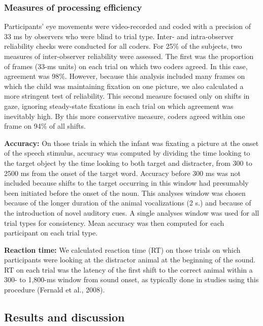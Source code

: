 \documentclass[english,floatsintext,man]{apa6}
\theoremstyle{definition}
\theoremstyle{definition}
\theoremstyle{definition}
\theoremstyle{remark}
\begin{document}
\hypertarget{measures-of-processing-efficiency}{%
\subsubsection{Measures of processing
efficiency}\label{measures-of-processing-efficiency}}

Participants' eye movements were video-recorded and coded with a
precision of 33 ms by observers who were blind to trial type. Inter- and
intra-observer reliability checks were conducted for all coders. For
25\% of the subjects, two measures of inter-observer reliability were
assessed. The first was the proportion of frames (33-ms units) on each
trial on which two coders agreed. In this case, agreement was 98\%.
However, because this analysis included many frames on which the child
was maintaining fixation on one picture, we also calculated a more
stringent test of reliability. This second measure focused only on
shifts in gaze, ignoring steady-state fixations in each trial on which
agreement was inevitably high. By this more conservative measure, coders
agreed within one frame on 94\% of all shifts.

\textbf{Accuracy:} On those trials in which the infant was fixating a
picture at the onset of the speech stimulus, accuracy was computed by
dividing the time looking to the target object by the time looking to
both target and distracter, from 300 to 2500 ms from the onset of the
target word. Accuracy before 300 ms was not included because shifts to
the target occurring in this window had presumably been initiated before
the onset of the noun. This analyses window was chosen because of the
longer duration of the animal vocalizations (2 s.) and because of the
introduction of novel auditory cues. A single analyses window was used
for all trial types for consistency. Mean accuracy was then computed for
each participant on each trial type.

\textbf{Reaction time:} We calculated reaction time (RT) on those trials
on which participants were looking at the distractor animal at the
beginning of the sound. RT on each trial was the latency of the first
shift to the correct animal within a 300- to 1,800-ms window from sound
onset, as typically done in studies using this procedure (Fernald et
al., 2008).

\hypertarget{results-and-discussion}{%
\subsection{Results and discussion}\label{results-and-discussion}}
\end{document}
